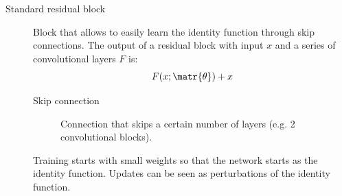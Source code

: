 \begin{description}
    \item[Standard residual block] 
        Block that allows to easily learn the identity function through skip connections.
        The output of a residual block with input $x$ and a series of convolutional layers $F$ is:
        \[ F(x; \matr{\theta}) + x \]

        \begin{minipage}{0.75\linewidth}
            \begin{description}
                \item[Skip connection] 
                    Connection that skips a certain number of layers (e.g. 2 convolutional blocks).
            \end{description}
    
            \begin{remark}
                Training starts with small weights so that the network starts as the identity function. Updates can be seen as perturbations of the identity function.
            \end{remark}
    

\end{minipage}
\end{description}
